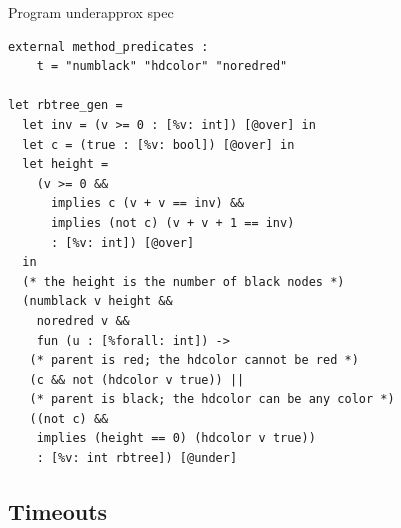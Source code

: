 \documentclass[review, sigplan]{acmart}
\begin{document}
Program underapprox spec
\begin{lstlisting}[language=caml, basicstyle=\small\ttfamily]
external method_predicates :
    t = "numblack" "hdcolor" "noredred"

let rbtree_gen =
  let inv = (v >= 0 : [%v: int]) [@over] in
  let c = (true : [%v: bool]) [@over] in
  let height =
    (v >= 0 &&
      implies c (v + v == inv) &&
      implies (not c) (v + v + 1 == inv)
      : [%v: int]) [@over]
  in
  (* the height is the number of black nodes *)
  (numblack v height &&
    noredred v &&
    fun (u : [%forall: int]) ->
   (* parent is red; the hdcolor cannot be red *)
   (c && not (hdcolor v true)) ||
   (* parent is black; the hdcolor can be any color *)
   ((not c) &&
    implies (height == 0) (hdcolor v true))
    : [%v: int rbtree]) [@under]
\end{lstlisting}

\subsection{Timeouts}
\end{document}
